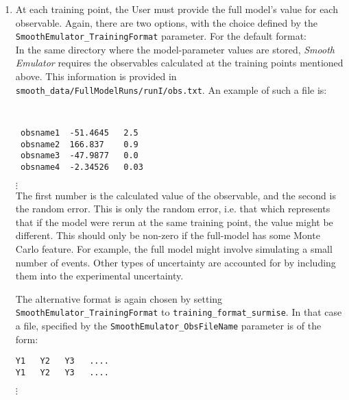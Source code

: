 \documentclass[UserManual.tex]{subfiles}
\begin{document}
\begin{enumerate}
\item At each training point, the User must provide the full model's value for each observable. Again, there are two options, with the choice defined by the {\tt SmoothEmulator\_TrainingFormat} parameter. For the default format:\\
In the same directory where the model-parameter values are stored, {\it Smooth Emulator} requires the observables calculated at the training points mentioned above. This information is provided in {\tt smooth\_data/FullModelRuns/runI/obs.txt}. An example of such a file is:
{\tt
\begin{verbatim}
 obsname1  -51.4645   2.5
 obsname2  166.837    0.9
 obsname3  -47.9877   0.0
 obsname4  -2.34526   0.03
\end{verbatim}}
\vspace*{-16pt}
 \hspace*{28pt}$\vdots$\\
The first number is the calculated value of the observable, and the second is the random error. This is only the random error, i.e. that which represents that if the model were rerun at the same training point, the value might be different. This should only be non-zero if the full-model has some Monte Carlo feature. For example, the full model might involve simulating a small number of events. Other types of uncertainty are accounted for by including them into the experimental uncertainty.

The alternative format is again chosen by setting {\tt SmoothEmulator\_TrainingFormat} to {\tt training\_format\_surmise}. In that case a file, specified by the {\tt SmoothEmulator\_ObsFileName} parameter is of the form:\\
\vspace*{-8pt}
{\tt\begin{verbatim}
Y1   Y2   Y3   ....
Y1   Y2   Y3   ....
\end{verbatim}}
\vspace*{-16pt}
 \hspace*{28pt}$\vdots$\\


\end{enumerate}
\end{document}
